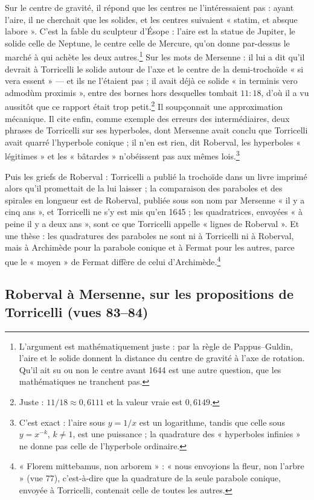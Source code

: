\documentclass[11pt,a4paper]{article}
\begin{document}
Sur le centre de gravité, il répond que les centres ne l'intéressaient pas :
ayant l'aire, il ne cherchait que les solides, et les centres suivaient
« statim, et absque labore ». C'est la fable du sculpteur d'Ésope : l'aire est la
statue de Jupiter, le solide celle de Neptune, le centre celle de Mercure, qu'on
donne par-dessus le marché à qui achète les deux autres.\footnote{L'argument est
mathématiquement juste : par la règle de Pappus--Guldin, l'aire et le solide
donnent la distance du centre de gravité à l'axe de rotation. Qu'il ait su ou
non le centre avant 1644 est une autre question, que les mathématiques ne
tranchent pas.} Sur les mots de Mersenne : il lui a dit qu'il devrait à
Torricelli le solide autour de l'axe et le centre de la demi-trochoïde « si vera
essent » — et ils ne l'étaient pas ; il avait déjà ce solide « in terminis vero
admodùm proximis », entre des bornes hors desquelles tombait $11:18$, d'où il a
vu aussitôt que ce rapport était trop petit.\footnote{Juste : $11/18\approx
0{,}6111$ et la valeur vraie est $0{,}6149$.} Il soupçonnait une approximation
mécanique. Il cite enfin, comme exemple des erreurs des intermédiaires, deux
phrases de Torricelli sur ses hyperboles, dont Mersenne avait conclu que
Torricelli avait quarré l'hyperbole conique ; il n'en est rien, dit Roberval, les
hyperboles « légitimes » et les « bâtardes » n'obéissent pas aux mêmes
lois.\footnote{C'est exact : l'aire sous $y=1/x$ est un logarithme, tandis que
celle sous $y=x^{-k}$, $k\ne 1$, est une puissance ; la quadrature des
« hyperboles infinies » ne donne pas celle de l'hyperbole ordinaire.}

Puis les griefs de Roberval : Torricelli a publié la trochoïde dans un livre
imprimé alors qu'il promettait de la lui laisser ; la comparaison des paraboles
et des spirales en longueur est de Roberval, publiée sous son nom par Mersenne
« il y a cinq ans », et Torricelli ne s'y est mis qu'en 1645 ; les quadratrices,
envoyées « à peine il y a deux ans », sont ce que Torricelli appelle « lignes de
Roberval ». Et une thèse : les quadratures des paraboles ne sont ni à Torricelli
ni à Roberval, mais à Archimède pour la parabole conique et à Fermat pour les
autres, parce que le « moyen » de Fermat diffère de celui
d'Archimède.\footnote{« Florem mittebamus, non arborem » : « nous envoyions la
fleur, non l'arbre » (vue 77), c'est-à-dire que la quadrature de la seule
parabole conique, envoyée à Torricelli, contenait celle de toutes les autres.}

\subsection*{Roberval à Mersenne, sur les propositions de Torricelli (vues 83--84)}
\end{document}
